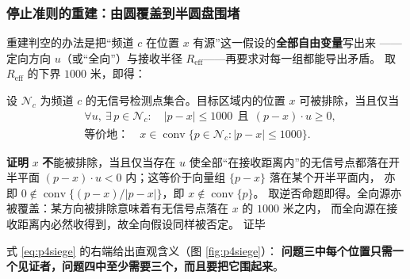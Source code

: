 \documentclass[withoutpreface, bwprint]{cumcmthesis}
\renewenvironment{proof}{\par\noindent\textbf{证明}\quad}{\hfill 证毕\par\medskip}
\begin{document}
\subsubsection{停止准则的重建：由圆覆盖到半圆盘围堵}

重建判空的办法是把“频道 $c$ 在位置 $x$ 有源”这一假设的\textbf{全部自由变量}写出来
——定向方向 $u$（或“全向”）与接收半径 $R_{\mathrm{eff}}$——再要求对每一组都能导出矛盾。
取 $R_{\mathrm{eff}}$ 的下界 $1000$ 米，即得：

\begin{theorem}[围堵判空判据]
\label{thm:p4empty}
设 $\mathcal{N}_c$ 为频道 $c$ 的无信号检测点集合。目标区域内的位置 $x$ 可被排除，当且仅当
\begin{equation}
  \label{eq:p4siege}
  \begin{aligned}
    &\forall u,\ \exists\,p\in\mathcal{N}_c:\quad
      \lvert p-x\rvert\le 1000\ \ \text{且}\ \ (p-x)\cdot u\ge 0,\\[2pt]
    &\text{等价地：}\quad
      x\in\operatorname{conv}\bigl\{p\in\mathcal{N}_c:\lvert p-x\rvert\le 1000\bigr\}.
  \end{aligned}
\end{equation}
\end{theorem}

\begin{proof}
$x$ \textbf{不}能被排除，当且仅当存在 $u$ 使全部“在接收距离内”的无信号点都落在开半平面
$(p-x)\cdot u<0$ 内；这等价于向量组 $\{p-x\}$ 落在某个开半平面内，
亦即 $0\notin\operatorname{conv}\{(p-x)/\lvert p-x\rvert\}$，即 $x\notin\operatorname{conv}\{p\}$。
取逆否命题即得。全向源亦被覆盖：某方向被排除意味着有无信号点落在 $x$ 的 $1000$ 米之内，
而全向源在接收距离内必然收得到，故全向假设同样被否定。
\end{proof}

式 \eqref{eq:p4siege} 的右端给出直观含义（图 \ref{fig:p4siege}）：
\textbf{问题三中每个位置只需一个见证者，问题四中至少需要三个，而且要把它围起来}。
\end{document}
